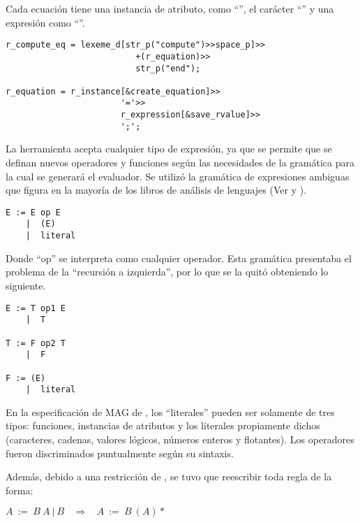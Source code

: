 Cada ecuación tiene una instancia de atributo, como ``'', el carácter ``\textttb{=}'' y una expresión como ``''.

\begin{lstlisting}[columns=fullflexible, linewidth=10cm]
r_compute_eq = lexeme_d[str_p("compute")>>space_p]>>
                          +(r_equation)>>
                          str_p("end");

r_equation = r_instance[&create_equation]>>
                       '='>>
                       r_expression[&save_rvalue]>>
                       ';';
\end{lstlisting}

La herramienta acepta cualquier tipo de expresión, ya que se permite que se definan nuevos operadores y funciones según las necesidades de la gramática para la cual se generará el evaluador. Se utilizó la gramática de expresiones ambiguas que figura en la mayoría de los libros de análisis de lenguajes (Ver \cite{gramatica} y \cite{compiladores}).

\begin{lstlisting}[basicstyle=\normalsize, backgroundcolor=\color{white}, columns=fullflexible, linewidth=7cm]
E := E op E
    |  (E)
    |  literal
\end{lstlisting}

Donde ``op'' se interpreta como cualquier operador. Esta gramática presentaba el problema de la ``recursión a izquierda'', por lo que se la quitó obteniendo lo siguiente.

\begin{lstlisting}[basicstyle=\normalsize, float=!ht, backgroundcolor=\color{white}, columns=fullflexible, linewidth=7cm]
E := T op1 E
    |  T

T := F op2 T
    |  F

F := (E)
    |  literal
\end{lstlisting}

En la especificación de MAG de \maggen, los ``literales'' pueden ser solamente de tres tipos: funciones, instancias de atributos y los literales propiamente dichos (caracteres, cadenas, valores lógicos, números enteros y flotantes). Los operadores fueron discriminados puntualmente según su sintaxis.

Además, debido a una restricción de \spirit, se tuvo que reescribir toda regla de la forma:

\begin{center}\textbf{\large{$A\ :=\ B\ A\ |\ B\ \ \ \ \Rightarrow\ \ \ \ A\ :=\ B\ (A)*$}}\end{center}

